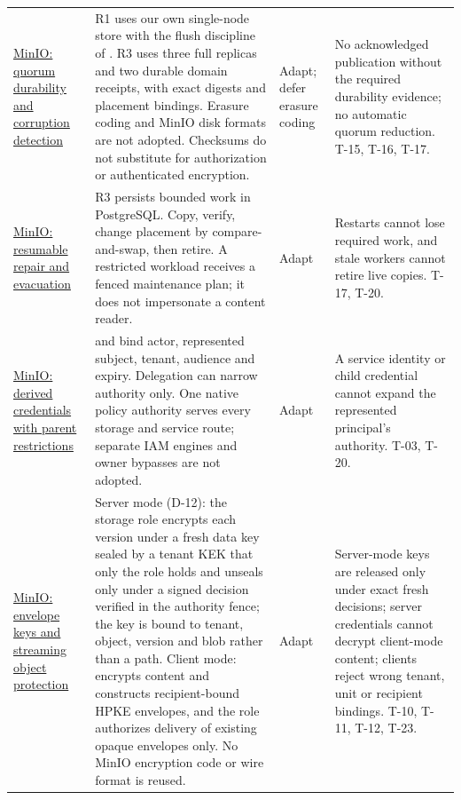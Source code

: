\begin{longtable}{@{}P{0.21\textwidth}P{0.39\textwidth}P{0.10\textwidth}P{0.20\textwidth}@{}}
\href{https://github.com/minio/minio/blob/7aac2a2c5b7c882e68c1ce017d8256be2feea27f/cmd/erasure-object.go#L1440}{MinIO: quorum durability and corruption detection} & R1 uses our own single-node store with the flush discipline of . R3  uses three full replicas and two durable domain receipts, with exact digests and placement bindings. Erasure coding and MinIO disk formats are not adopted. Checksums do not substitute for authorization or authenticated encryption. & Adapt; defer erasure coding & No acknowledged publication without the required durability evidence; no automatic quorum reduction. T-15, T-16, T-17.\\
\href{https://github.com/minio/minio/blob/7aac2a2c5b7c882e68c1ce017d8256be2feea27f/cmd/erasure-server-pool-decom.go#L605}{MinIO: resumable repair and evacuation} & R3  persists bounded work in PostgreSQL. Copy, verify, change placement by compare-and-swap, then retire. A restricted workload receives a fenced maintenance plan; it does not impersonate a content reader. & Adapt & Restarts cannot lose required work, and stale workers cannot retire live copies. T-17, T-20.\\
\href{https://github.com/minio/minio/blob/7aac2a2c5b7c882e68c1ce017d8256be2feea27f/cmd/admin-handlers-users.go#L2893}{MinIO: derived credentials with parent restrictions} &  and  bind actor, represented subject, tenant, audience and expiry. Delegation can narrow authority only. One native policy authority serves every storage and service route; separate IAM engines and owner bypasses are not adopted. & Adapt & A service identity or child credential cannot expand the represented principal's authority. T-03, T-20.\\
\href{https://github.com/minio/minio/blob/7aac2a2c5b7c882e68c1ce017d8256be2feea27f/cmd/encryption-v1.go#L554}{MinIO: envelope keys and streaming object protection} & Server mode (D-12): the storage role encrypts each version under a fresh data key sealed by a tenant KEK that only the  role holds and unseals only under a signed decision verified in the authority fence; the key is bound to tenant, object, version and blob rather than a path. Client mode:  encrypts content and constructs recipient-bound HPKE envelopes, and the  role authorizes delivery of existing opaque envelopes only. No MinIO encryption code or wire format is reused. & Adapt & Server-mode keys are released only under exact fresh decisions; server credentials cannot decrypt client-mode content; clients reject wrong tenant, unit or recipient bindings. T-10, T-11, T-12, T-23.\\
\bottomrule
\end{longtable}

